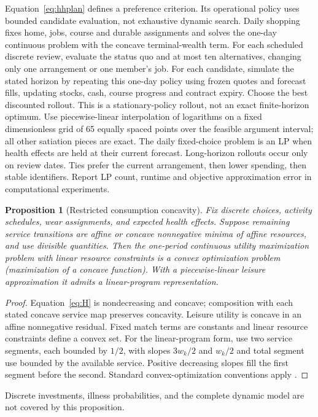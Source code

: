\documentclass[10pt,a4paper,twocolumn]{article}
\newtheorem{proposition}{Proposition}
\begin{document}
Equation~\eqref{eq:hhplan} defines a preference criterion. Its operational
policy uses bounded candidate evaluation, not exhaustive dynamic search.
Daily shopping fixes home, jobs, course and durable assignments and solves
the one-day continuous problem with the concave terminal-wealth term.
For each scheduled discrete review, evaluate the status quo and at most
ten alternatives, changing only one arrangement or one member's job.
For each candidate, simulate the stated horizon by repeating this one-day
policy using frozen quotes and forecast fills, updating stocks, cash,
course progress and contract expiry. Choose the best discounted rollout.
This is a stationary-policy rollout, not an exact finite-horizon optimum.
Use piecewise-linear interpolation of logarithms on a fixed dimensionless
grid of 65 equally spaced points over the feasible argument interval;
all other satiation pieces are exact. The daily fixed-choice problem is
an LP when health effects are held at their current forecast.
Long-horizon rollouts occur only on review dates. Ties prefer the current
arrangement, then lower spending, then stable identifiers. Report LP count,
runtime and objective approximation error in computational experiments.

\begin{proposition}[Restricted consumption concavity]
Fix discrete choices, activity schedules, wear assignments, and expected
health effects. Suppose remaining service transitions are affine or
concave nonnegative minima of affine resources, and use divisible
quantities. Then the one-period continuous utility maximization problem
with linear resource constraints is a convex optimization problem
(maximization of a concave function). With a piecewise-linear leisure
approximation it admits a linear-program representation.
\end{proposition}
\begin{proof}
Equation~\eqref{eq:H} is nondecreasing and concave; composition with each
stated concave service map preserves concavity. Leisure utility is
concave in an affine nonnegative residual. Fixed match terms are
constants and linear resource constraints define a convex set. For the
linear-program form, use two service segments, each bounded by $1/2$,
with slopes $3w_k/2$ and $w_k/2$ and total segment use bounded by the
available service. Positive decreasing slopes fill the first segment
before the second. Standard convex-optimization conventions apply
\cite{boyd2004}.
\end{proof}
Discrete investments, illness probabilities, and the complete dynamic
model are not covered by this proposition.
\end{document}
